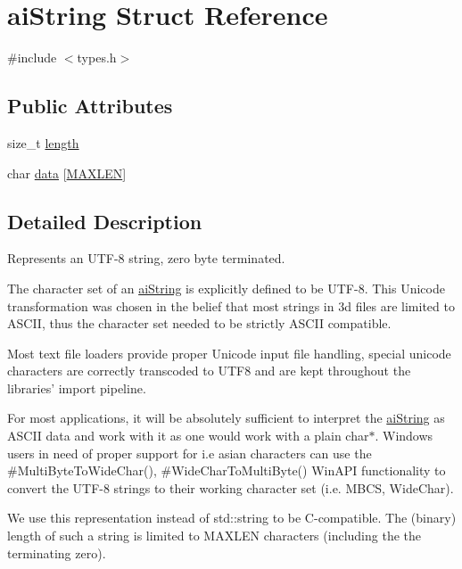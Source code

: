 \hypertarget{structaiString}{\section{ai\-String \-Struct \-Reference}
\label{structaiString}
}


{\ttfamily \#include $<$types.\-h$>$}

\subsection*{\-Public \-Attributes}
\begin{DoxyCompactItemize}
\item 
size\-\_\-t \hyperlink{structaiString_a7d77c2031ff0340746aa046f7fbcf313}{length}
\item 
char \hyperlink{structaiString_aa90b1da7d347a3dcca0a95061e6ea41d}{data} \mbox{[}\hyperlink{types_8h_ae6648cd71a8bd49d58ae8ed33ba910d1}{\-M\-A\-X\-L\-E\-N}\mbox{]}
\end{DoxyCompactItemize}


\subsection{\-Detailed \-Description}
\-Represents an \-U\-T\-F-\/8 string, zero byte terminated.

\-The character set of an \hyperlink{structaiString}{ai\-String} is explicitly defined to be \-U\-T\-F-\/8. \-This \-Unicode transformation was chosen in the belief that most strings in 3d files are limited to \-A\-S\-C\-I\-I, thus the character set needed to be strictly \-A\-S\-C\-I\-I compatible.

\-Most text file loaders provide proper \-Unicode input file handling, special unicode characters are correctly transcoded to \-U\-T\-F8 and are kept throughout the libraries' import pipeline.

\-For most applications, it will be absolutely sufficient to interpret the \hyperlink{structaiString}{ai\-String} as \-A\-S\-C\-I\-I data and work with it as one would work with a plain char$\ast$. \-Windows users in need of proper support for i.\-e asian characters can use the \#\-Multi\-Byte\-To\-Wide\-Char(), \#\-Wide\-Char\-To\-Multi\-Byte() \-Win\-A\-P\-I functionality to convert the \-U\-T\-F-\/8 strings to their working character set (i.\-e. \-M\-B\-C\-S, \-Wide\-Char).

\-We use this representation instead of std\-::string to be \-C-\/compatible. \-The (binary) length of such a string is limited to \-M\-A\-X\-L\-E\-N characters (including the the terminating zero). 

